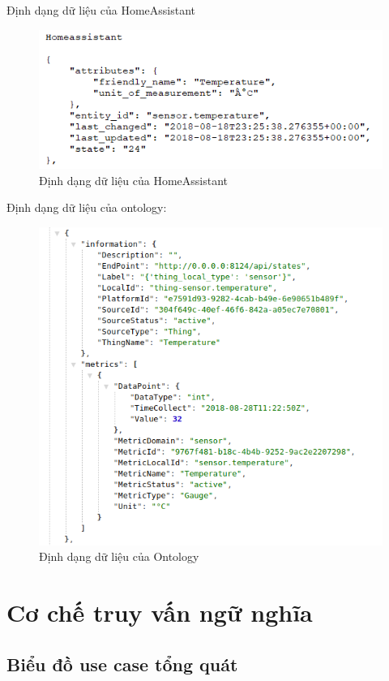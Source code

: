 Định dạng dữ liệu của HomeAssistant
\begin{figure}[h!]
	\center
	\includegraphics[scale=0.6]{image/homeassistant_dataformat}
	\caption{Định dạng dữ liệu của HomeAssistant}
\end{figure}


Định dạng dữ liệu của ontology:
\begin{figure}[h!]
	\center
	\includegraphics[scale=0.6]{image/ontology_dataformat}
	\caption{Định dạng dữ liệu của Ontology}
\end{figure}

\section{Cơ chế truy vấn ngữ nghĩa}
\subsection{Biểu đồ use case tổng quát}

